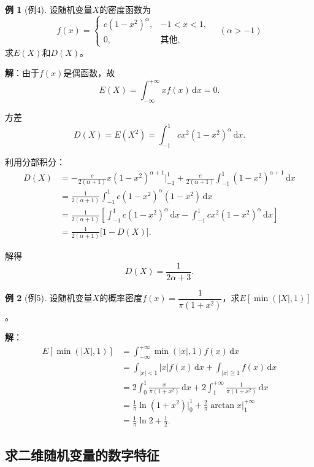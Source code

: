 \documentclass[11pt,a4paper]{report}
\theoremstyle{definition}
\newtheorem{example}{例}[chapter]
\theoremstyle{plain}
\begin{document}
\begin{example}[例4]
设随机变量$X$的密度函数为
\[
f(x)=\begin{cases}
c(1-x^2)^\alpha, & -1<x<1,\\
0, & \text{其他},
\end{cases}
\quad (\alpha>-1)
\]
求$E(X)$和$D(X)$。

\textbf{解}：由于$f(x)$是偶函数，故
\[
E(X)=\int_{-\infty}^{+\infty}x f(x)\,\mathrm{d}x=0.
\]

方差
\[
D(X)=E(X^2)=\int_{-1}^{1}c x^2(1-x^2)^\alpha\,\mathrm{d}x.
\]

利用分部积分：
\[
\begin{aligned}
D(X)&=-\frac{c}{2(\alpha+1)}x(1-x^2)^{\alpha+1}\Big|_{-1}^{1}
+\frac{c}{2(\alpha+1)}\int_{-1}^{1}(1-x^2)^{\alpha+1}\,\mathrm{d}x\\
&=\frac{1}{2(\alpha+1)}\int_{-1}^{1}c(1-x^2)^{\alpha}(1-x^2)\,\mathrm{d}x\\
&=\frac{1}{2(\alpha+1)}\left[\int_{-1}^{1}c(1-x^2)^\alpha\,\mathrm{d}x-\int_{-1}^{1}c x^2(1-x^2)^\alpha\,\mathrm{d}x\right]\\
&=\frac{1}{2(\alpha+1)}\big[1-D(X)\big].
\end{aligned}
\]

解得
\[
D(X)=\frac{1}{2\alpha+3}.
\]
\end{example}

\begin{example}[例5]
设随机变量$X$的概率密度$f(x)=\dfrac{1}{\pi(1+x^2)}$，求$E[\min(|X|,1)]$。

\textbf{解}：
\[
\begin{aligned}
E[\min(|X|,1)]
&=\int_{-\infty}^{+\infty}\min(|x|,1)f(x)\,\mathrm{d}x\\
&=\int_{|x|<1}|x|f(x)\,\mathrm{d}x+\int_{|x|\geq 1}f(x)\,\mathrm{d}x\\
&=2\int_{0}^{1}\frac{x}{\pi(1+x^2)}\,\mathrm{d}x+2\int_{1}^{+\infty}\frac{1}{\pi(1+x^2)}\,\mathrm{d}x\\
&=\frac{1}{\pi}\ln(1+x^2)\Big|_{0}^{1}+\frac{2}{\pi}\arctan x\Big|_{1}^{+\infty}\\
&=\frac{1}{\pi}\ln 2+\frac{1}{2}.
\end{aligned}
\]
\end{example}

\subsection{求二维随机变量的数字特征}
\end{document}
